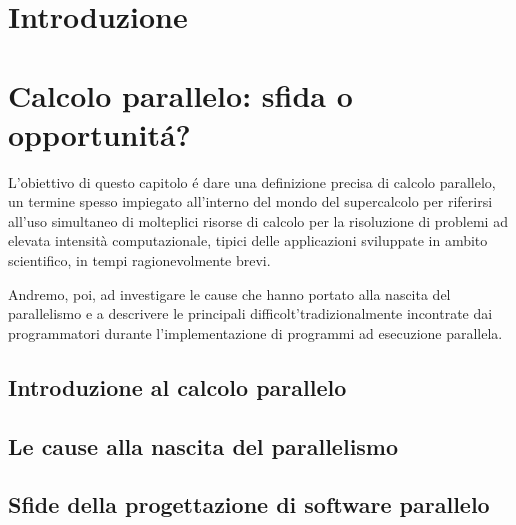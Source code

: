 \documentclass[
	a4paper,
	twoside,
	12pt
]{book}
\begin{document}
\frontmatter


\tableofcontents

\mainmatter
\chapter*{Introduzione}

\chapter{Calcolo parallelo: sfida o opportunit\'a?}
\label{cap1}
L'obiettivo di questo capitolo \'e dare una definizione precisa di calcolo parallelo, un termine spesso impiegato all'interno del mondo
del supercalcolo per riferirsi all’uso simultaneo di molteplici risorse di calcolo per la risoluzione di problemi ad elevata intensità computazionale, tipici delle applicazioni sviluppate in ambito scientifico, in tempi ragionevolmente brevi.

Andremo, poi, ad investigare le cause che hanno portato alla nascita del parallelismo e a descrivere le principali difficolt'\a tradizionalmente incontrate dai programmatori durante l'implementazione di programmi ad esecuzione parallela.
\section{Introduzione al calcolo parallelo}
\label{par1.1}

\section{Le cause alla nascita del parallelismo}
\label{par1.2}

\section{Sfide della progettazione di software parallelo}
\label{par1.3}

\backmatter



\end{document}
